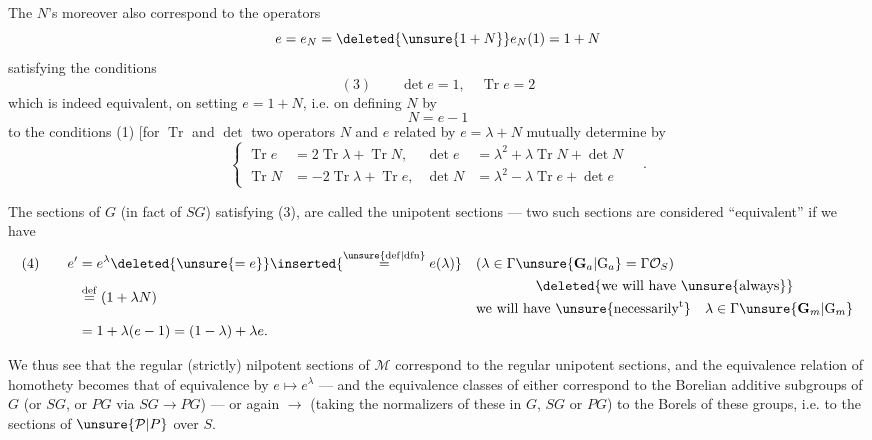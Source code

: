 The $N$'s moreover also correspond to the operators
\[
e=e_N=\deleted{\unsure{1+N}}e_N(1)=1+N
\]
satisfying the conditions
\[
(3)\qquad\det e=1,\quad\operatorname{Tr}e=2
\]
which is indeed equivalent, on setting $e=1+N$, i.e. on defining $N$ by
\[
N=e-1
\]
to the conditions (1) [for $\operatorname{Tr}$ and $\det$  two operators $N$ and $e$ related by $e=\lambda+N$ mutually determine  by
\[
\left\{
\begin{aligned}
\operatorname{Tr}e&=2\operatorname{Tr}\lambda+\operatorname{Tr}N,&
\det e&=\lambda^2+\lambda\operatorname{Tr}N+\det N\\
\operatorname{Tr}N&=-2\operatorname{Tr}\lambda+\operatorname{Tr}e,&
\det N&=\lambda^2-\lambda\operatorname{Tr}e+\det e
\end{aligned}
\right.
\quad .
\]



The  sections of $G$ (in fact of $SG$) satisfying (3),  are called the   unipotent sections --- two such sections  are considered ``equivalent'' if we have
\[
\begin{aligned}
(4)\qquad e'&=e^\lambda\deleted{\unsure{=e}}\inserted{\overset{\unsure{\mathrm{def}|\mathrm{dfn}}}{=}e(\lambda)}
&& (\lambda\in\Gamma\unsure{\mathbf G_a|\mathrm G_a}=\Gamma\mathcal O_S)\\
&\overset{\mathrm{def}}{=}(1+\lambda N)
&&\begin{gathered}\deleted{\text{we will have }\unsure{\text{always}}}\\\text{we will have }\unsure{\text{necessarily}^{\mathrm t}}\quad\lambda\in\Gamma\unsure{\mathbf G_m|\mathrm G_m}\end{gathered}\\
&=1+\lambda(e-1)=(1-\lambda)+\lambda e.
\end{aligned}
\]

We thus see that the regular (strictly) nilpotent sections of $\mathcal M$ correspond  to the regular unipotent sections, and the equivalence relation of homothety becomes that of equivalence by $e\longmapsto e^\lambda$ --- and the equivalence classes of either correspond to the Borelian additive subgroups of $G$ (or $SG$, or $PG$ via $SG\longrightarrow PG$) --- or again $\longrightarrow$ (taking the normalizers of these in $G$, $SG$ or $PG$) to the Borels of these groups, i.e. to the sections of $\unsure{\mathcal P|P}$ over $S$.

